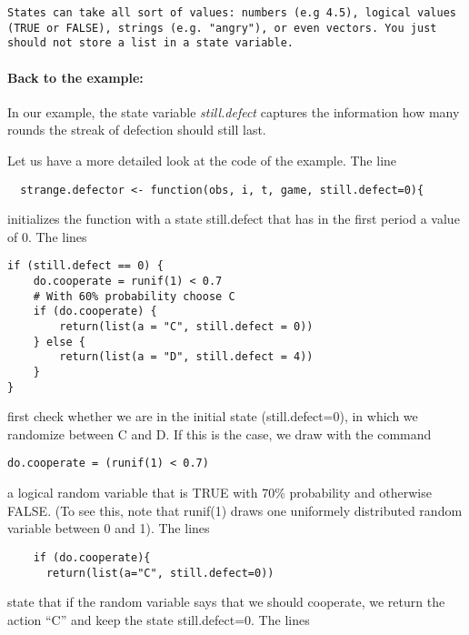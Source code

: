 \documentclass[]{article}
\begin{document}
\begin{verbatim}
States can take all sort of values: numbers (e.g 4.5), logical values (TRUE or FALSE), strings (e.g. "angry"), or even vectors. You just should not store a list in a state variable.
\end{verbatim}

\paragraph{Back to the example:}

In our example, the state variable \emph{still.defect} captures the
information how many rounds the streak of defection should still last.

Let us have a more detailed look at the code of the example. The line

\begin{verbatim}
  strange.defector <- function(obs, i, t, game, still.defect=0){
\end{verbatim}

initializes the function with a state still.defect that has in the first
period a value of 0. The lines

\begin{verbatim}
if (still.defect == 0) {
    do.cooperate = runif(1) < 0.7
    # With 60% probability choose C
    if (do.cooperate) {
        return(list(a = "C", still.defect = 0))
    } else {
        return(list(a = "D", still.defect = 4))
    }
}
\end{verbatim}

first check whether we are in the initial state (still.defect=0), in
which we randomize between C and D. If this is the case, we draw with
the command

\begin{verbatim}
do.cooperate = (runif(1) < 0.7)
\end{verbatim}

a logical random variable that is TRUE with 70\% probability and
otherwise FALSE. (To see this, note that runif(1) draws one uniformely
distributed random variable between 0 and 1). The lines

\begin{verbatim}
    if (do.cooperate){
      return(list(a="C", still.defect=0))
\end{verbatim}

state that if the random variable says that we should cooperate, we
return the action ``C'' and keep the state still.defect=0. The lines
\end{document}
